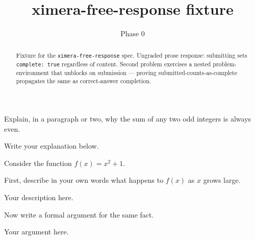 \documentclass{ximera}
\title{ximera-free-response fixture}
\author{Phase 0}
\begin{document}
\begin{abstract}
Fixture for the \texttt{ximera-free-response} spec. Ungraded prose response: submitting sets \texttt{complete: true} regardless of content. Second problem exercises a nested problem-environment that unblocks on submission --- proving submitted-counts-as-complete propagates the same as correct-answer completion.
\end{abstract}

\maketitle

\begin{problem}
  Explain, in a paragraph or two, why the sum of any two odd integers is always even.

  \begin{freeResponse}
    Write your explanation below.
  \end{freeResponse}
\end{problem}

\begin{problem}
  Consider the function $f(x) = x^2 + 1$.

  \begin{problem}
    First, describe in your own words what happens to $f(x)$ as $x$ grows large.
    \begin{freeResponse}
      Your description here.
    \end{freeResponse}
  \end{problem}

  \begin{problem}
    Now write a formal argument for the same fact.
    \begin{freeResponse}
      Your argument here.
    \end{freeResponse}
  \end{problem}
\end{problem}
\end{document}
